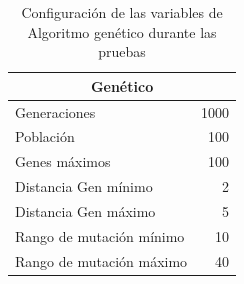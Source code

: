 \begin{table}[hbtp]
 \centering 
  \small
	\begin{tabular}{ | l | r | }
	    \multicolumn{2}{|c|}{ \rowcolor[gray]{0.75}Genético} \\\hline
			\cellcolor[gray]{0.9}Generaciones & 1000 \\\hline
			\cellcolor[gray]{0.9}Población & 100 \\\hline
			\cellcolor[gray]{0.9}Genes máximos & 100 \\\hline
			\cellcolor[gray]{0.9}Distancia Gen mínimo & 2 \\\hline
			\cellcolor[gray]{0.9}Distancia Gen máximo & 5 \\\hline
			\cellcolor[gray]{0.9}Rango de mutación mínimo & 10 \\\hline
			\cellcolor[gray]{0.9}Rango de mutación máximo & 40 \\\hline
    \end{tabular}
    \caption{Configuración de las variables de Algoritmo genético durante las pruebas}
    \label{table:ConfiguracionAG.tsp}
\end{table}



\clearpage \newpage